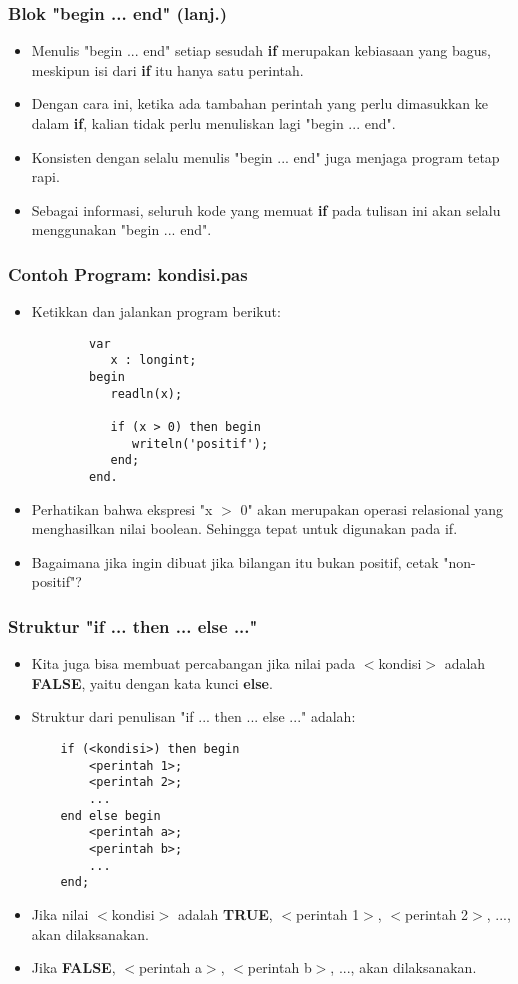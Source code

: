 \documentclass{beamer}
\begin{document}
\begin{frame}[fragile]
\frametitle{Blok "begin ... end" (lanj.)}
\begin{itemize}
    \item Menulis "begin ... end" setiap sesudah \textbf{if} merupakan kebiasaan yang bagus, meskipun isi dari \textbf{if} itu hanya satu perintah.
    \item Dengan cara ini, ketika ada tambahan perintah yang perlu dimasukkan ke dalam \textbf{if}, kalian tidak perlu menuliskan lagi "begin ... end".
    \item Konsisten dengan selalu menulis "begin ... end" juga menjaga program tetap rapi.
    \item Sebagai informasi, seluruh kode yang memuat \textbf{if} pada tulisan ini akan selalu menggunakan "begin ... end".
\end{itemize}
\end{frame}

\begin{frame}[fragile]
\frametitle{Contoh Program: kondisi.pas}
\begin{itemize}
    \item Ketikkan dan jalankan program berikut:
    \begin{lstlisting}
        var
           x : longint;
        begin
           readln(x);

           if (x > 0) then begin
              writeln('positif');
           end;
        end.
    \end{lstlisting}
    \item Perhatikan bahwa ekspresi "x $>$ 0" akan merupakan operasi relasional yang menghasilkan nilai boolean. Sehingga tepat untuk digunakan pada if.
    \item Bagaimana jika ingin dibuat jika bilangan itu bukan positif, cetak "non-positif"?
\end{itemize}
\end{frame}

\begin{frame}[fragile]
\frametitle{Struktur "if ... then ... else ..."}
\begin{itemize}
    \item Kita juga bisa membuat percabangan jika nilai pada $<$kondisi$>$ adalah \textbf{FALSE}, yaitu dengan kata kunci \textbf{else}.
    \item Struktur dari penulisan "if ... then ... else ..." adalah:
    \begin{lstlisting}
    if (<kondisi>) then begin
        <perintah 1>;
        <perintah 2>;
        ...
    end else begin
        <perintah a>;
        <perintah b>;
        ...
    end;
    \end{lstlisting}

    \item Jika nilai $<$kondisi$>$ adalah \textbf{TRUE}, $<$perintah 1$>$, $<$perintah 2$>$, ..., akan dilaksanakan.
    \item Jika \textbf{FALSE}, $<$perintah a$>$, $<$perintah b$>$, ..., akan dilaksanakan.
\end{itemize}
\end{frame}
\end{document}
